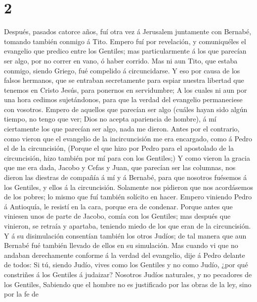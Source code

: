 \hypertarget{section-1}{%
\section{2}\label{section-1}}

 Después, pasados catorce años, fuí otra vez á Jerusalem
juntamente con Bernabé, tomando también conmigo á Tito. 
Empero fuí por revelación, y comuniquéles el evangelio que predico entre
los Gentiles; mas particularmente á los que parecían ser algo, por no
correr en vano, ó haber corrido.  Mas ni aun Tito, que
estaba conmigo, siendo Griego, fué compelido á circuncidarse.
 Y eso por causa de los falsos hermanos, que se entraban
secretamente para espiar nuestra libertad que tenemos en Cristo Jesús,
para ponernos en servidumbre;  A los cuales ni aun por una
hora cedimos sujetándonos, para que la verdad del evangelio permaneciese
con vosotros.  Empero de aquellos que parecían ser algo
(cuáles hayan sido algún tiempo, no tengo que ver; Dios no acepta
apariencia de hombre), á mí ciertamente los que parecían ser algo, nada
me dieron.  Antes por el contrario, como vieron que el
evangelio de la incircuncisión me era encargado, como á Pedro el de la
circuncisión,  (Porque el que hizo por Pedro para el
apostolado de la circuncisión, hizo también por mí para con los
Gentiles;)  Y como vieron la gracia que me era dada, Jacobo
y Cefas y Juan, que parecían ser las columnas, nos dieron las diestras
de compañía á mí y á Bernabé, para que nosotros fuésemos á los Gentiles,
y ellos á la circuncisión.  Solamente nos pidieron que nos
acordásemos de los pobres; lo mismo que fuí también solícito en hacer.
 Empero viniendo Pedro á Antioquía, le resistí en la cara,
porque era de condenar.  Porque antes que viniesen unos de
parte de Jacobo, comía con los Gentiles; mas después que vinieron, se
retraía y apartaba, teniendo miedo de los que eran de la circuncisión.
 Y á su disimulación consentían también los otros Judíos;
de tal manera que aun Bernabé fué también llevado de ellos en su
simulación.  Mas cuando vi que no andaban derechamente
conforme á la verdad del evangelio, dije á Pedro delante de todos: Si
tú, siendo Judío, vives como los Gentiles y no como Judío, ¿por qué
constriñes á los Gentiles á judaizar?  Nosotros Judíos
naturales, y no pecadores de los Gentiles,  Sabiendo que el
hombre no es justificado por las obras de la ley, sino por la fe de

